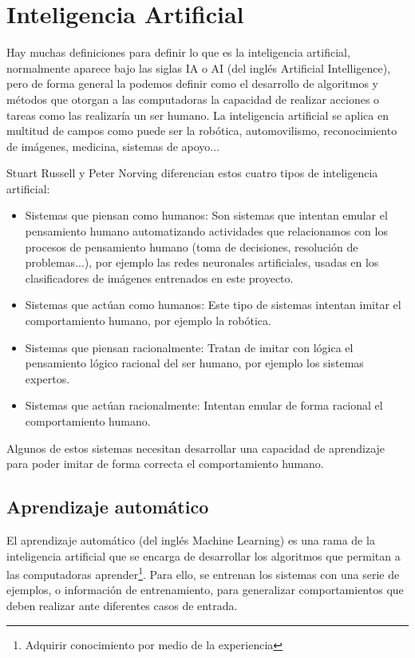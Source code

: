 \newpage
\section{Inteligencia Artificial}
Hay muchas definiciones para definir lo que es la inteligencia artificial, normalmente aparece bajo las siglas IA o AI (del inglés Artificial Intelligence), pero de forma general la podemos definir como el desarrollo de algoritmos y métodos que otorgan a las computadoras la capacidad de realizar acciones o tareas como las realizaría un ser humano. La inteligencia artificial se aplica en multitud de campos como puede ser la robótica, automovilismo, reconocimiento de imágenes, medicina, sistemas de apoyo...

Stuart Russell y Peter Norving \cite{wiki:tiposInteligenciaArtificial}  diferencian estos cuatro tipos de inteligencia artificial:

\begin{itemize}
	\item{Sistemas que piensan como humanos}: Son sistemas que intentan emular el pensamiento humano automatizando actividades que relacionamos con los procesos de pensamiento humano (toma de decisiones, resolución de problemas...), por ejemplo las redes neuronales artificiales, usadas en los clasificadores de imágenes entrenados en este proyecto.
	\item{Sistemas que actúan como humanos}: Este tipo de sistemas intentan imitar el comportamiento humano, por ejemplo la robótica.
	\item{Sistemas que piensan racionalmente}: Tratan de imitar con lógica el pensamiento lógico racional del ser humano, por ejemplo los sistemas expertos.
	\item{Sistemas que actúan racionalmente}: Intentan emular de forma racional el comportamiento humano.
\end{itemize}

Algunos de estos sistemas necesitan desarrollar una capacidad de aprendizaje para poder imitar de forma correcta el comportamiento humano.

\subsection{Aprendizaje automático}

El aprendizaje automático (del inglés Machine Learning) es una rama de la inteligencia artificial que se encarga de desarrollar los algoritmos que permitan a las computadoras aprender\footnote{Adquirir conocimiento por medio de la experiencia}. Para ello, se entrenan los sistemas con una serie de ejemplos, o información de entrenamiento, para generalizar comportamientos que deben realizar ante diferentes casos de entrada.

